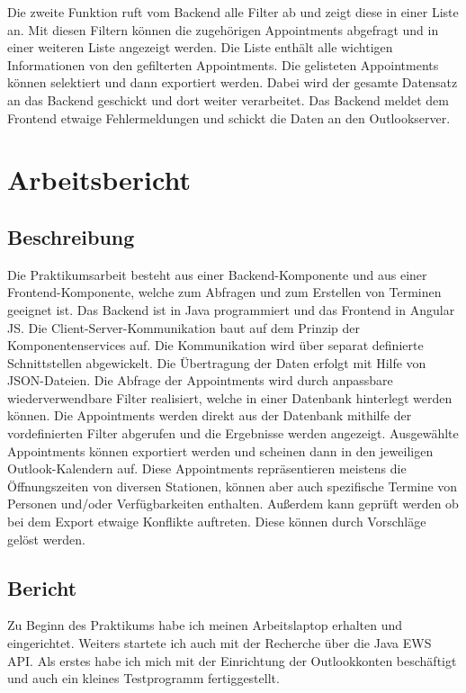 Die zweite Funktion ruft vom Backend alle Filter ab und zeigt diese in einer Liste an. Mit diesen Filtern können die zugehörigen Appointments abgefragt und in einer weiteren Liste angezeigt werden. Die Liste enthält alle wichtigen Informationen von den gefilterten Appointments. Die gelisteten Appointments können selektiert und dann exportiert werden. Dabei wird der gesamte Datensatz an das Backend geschickt und dort weiter verarbeitet. Das Backend meldet dem Frontend etwaige Fehlermeldungen und schickt die Daten an den Outlookserver.

\section{Arbeitsbericht}
\subsection{Beschreibung}
Die Praktikumsarbeit besteht aus einer Backend-Komponente und aus einer Frontend-Komponente, welche zum Abfragen und zum Erstellen von Terminen geeignet ist. Das Backend ist in Java programmiert und das Frontend in Angular JS. Die Client-Server-Kommunikation baut auf dem Prinzip der Komponentenservices auf. Die Kommunikation wird über separat definierte Schnittstellen abgewickelt. Die Übertragung der Daten erfolgt mit Hilfe von JSON-Dateien.  Die Abfrage der Appointments wird durch anpassbare wiederverwendbare Filter realisiert, welche in einer Datenbank hinterlegt werden können. Die Appointments werden direkt aus der Datenbank mithilfe der vordefinierten Filter abgerufen und die Ergebnisse werden angezeigt. Ausgewählte Appointments können exportiert werden und  scheinen dann in den jeweiligen Outlook-Kalendern auf. Diese Appointments repräsentieren meistens die Öffnungszeiten von diversen Stationen, können aber auch spezifische Termine von Personen und/oder Verfügbarkeiten enthalten. Außerdem kann geprüft werden ob bei dem Export etwaige Konflikte auftreten. Diese können durch Vorschläge gelöst werden. 
\subsection{Bericht}
Zu Beginn des Praktikums habe ich meinen Arbeitslaptop erhalten und eingerichtet. Weiters startete  ich auch mit der Recherche über die Java EWS API. Als erstes habe ich mich mit der Einrichtung der Outlookkonten beschäftigt und auch ein kleines Testprogramm fertiggestellt.\\

